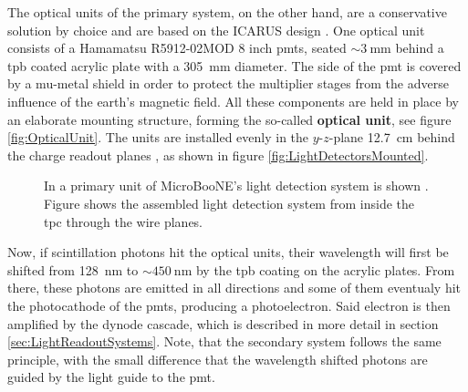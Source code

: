 The optical units of the primary system, on the other hand, are a conservative solution by choice \cite{MicroBooNEProposal1,MicroBooNEProposal2} and are based on the ICARUS design \cite{ICARUST600}. One optical unit consists of a Hamamatsu R5912-02MOD \num{8} inch \glspl{pmt}, seated $\sim\SI{3}{\milli\metre}$ behind a \gls{tpb} coated acrylic plate with a \SI{305}{\milli\metre} diameter. The side of the \gls{pmt} is covered by a mu-metal shield in order to protect the multiplier stages from the adverse influence of the earth's magnetic field. All these components are held in place by an elaborate mounting structure, forming the so-called \textbf{optical unit}, see figure \ref{fig:OpticalUnit}. The units are installed evenly in the $y$-$z$-plane \SI{12.7}{\centi\metre} behind the charge readout planes \cite{MicroBooNEDetector}, as shown in figure \ref{fig:LightDetectorsMounted}.
\begin{figure}[htbp]
    \centering
    \caption[MicroBooNE's Light Detection System]{In  a primary unit of MicroBooNE's light detection system is shown \cite{MicroBooNEDetector}. Figure  shows the assembled light detection system from inside the \gls{tpc} through the wire planes.}
    \label{fig:LightDetectionSystem}
\end{figure}
Now, if scintillation photons hit the optical units, their wavelength will first be shifted from \SI{128}{\nano\metre} to $\sim\SI{450}{\nano\metre}$ by the \gls{tpb} coating on the acrylic plates. From there, these photons are emitted in all directions and some of them eventualy hit the photocathode of the \glspl{pmt}, producing a photoelectron. Said electron is then amplified by the dynode cascade, which is described in more detail in section \ref{sec:LightReadoutSystems}. Note, that the secondary system follows the same principle, with the small difference that the wavelength shifted photons are guided by the light guide to the \gls{pmt}. 

